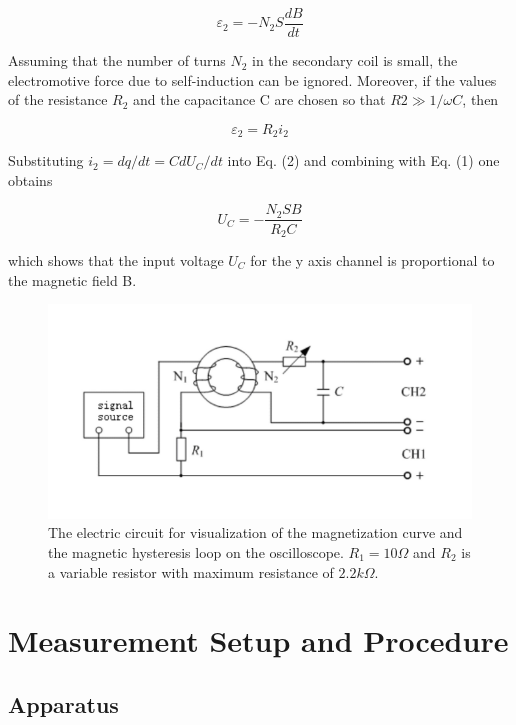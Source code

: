 \documentclass{article}
\begin{document}
\begin{equation}
\varepsilon_2=-N_2S\frac{dB}{dt}
\end{equation}

Assuming that the number of turns $N_2$ in the secondary coil is small, the electromotive
force due to self-induction can be ignored. Moreover, if the values of the resistance $R_2$ and the capacitance C are chosen so that $R2 \gg 1/\omega C$, then

\begin{equation}
\varepsilon_2=R_2i_2
\end{equation}

Substituting $i_2=dq/dt=CdU_C/dt$ into Eq. (2) and combining with Eq. (1) one obtains

\begin{equation}
U_C=-\frac{N_2SB}{R_2C}
\end{equation}

which shows that the input voltage $U_C$ for the y axis channel is proportional to the
magnetic field B.

\begin{figure}[H]
	\centering
	\includegraphics[scale=0.6]{fig3.png}
	\caption{The electric circuit for visualization of the magnetization curve and the magnetic hysteresis loop on the oscilloscope. $R_1 = 10\Omega$ and $R_2$ is a variable resistor with maximum resistance of $2.2k\Omega$.}
\end{figure}

\section{Measurement Setup and Procedure}

\subsection{Apparatus}
\end{document}
